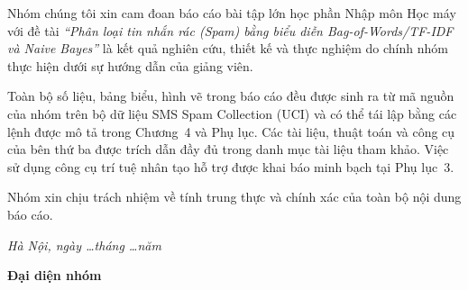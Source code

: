 
Nhóm chúng tôi xin cam đoan báo cáo bài tập lớn học phần Nhập môn Học máy với đề tài \textit{``Phân loại tin nhắn rác (Spam) bằng biểu diễn Bag-of-Words/TF-IDF và Naive Bayes''} là kết quả nghiên cứu, thiết kế và thực nghiệm do chính nhóm thực hiện dưới sự hướng dẫn của giảng viên.

Toàn bộ số liệu, bảng biểu, hình vẽ trong báo cáo đều được sinh ra từ mã nguồn của nhóm trên bộ dữ liệu SMS Spam Collection (UCI) và có thể tái lập bằng các lệnh được mô tả trong Chương~4 và Phụ lục. Các tài liệu, thuật toán và công cụ của bên thứ ba được trích dẫn đầy đủ trong danh mục tài liệu tham khảo. Việc sử dụng công cụ trí tuệ nhân tạo hỗ trợ được khai báo minh bạch tại Phụ lục~3.

Nhóm xin chịu trách nhiệm về tính trung thực và chính xác của toàn bộ nội dung báo cáo.

\vspace{1cm}

\begin{flushright}
\begin{minipage}{8cm}
\centering
\textit{Hà Nội, ngày \ldots tháng \ldots năm \Nam}

\vspace{0.5cm}

\textbf{Đại diện nhóm}

\vspace{2cm}
\end{minipage}
\end{flushright}
